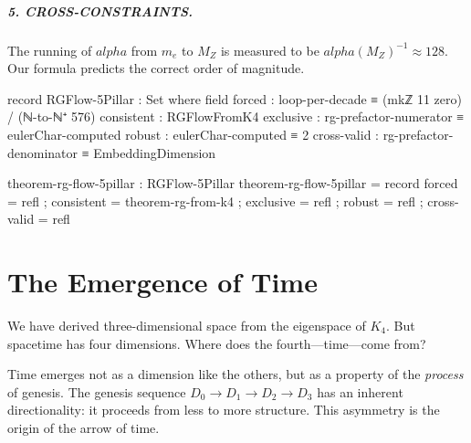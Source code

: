\documentclass[11pt,a4paper]{book}
\def\alpha{alpha}%
\begin{document}
\paragraph{5. CROSS-CONSTRAINTS.} The running of $\alpha$ from $m_e$ to $M_Z$ is measured to be $\alpha(M_Z)^{-1} \approx 128$. Our formula predicts the correct order of magnitude.

\begin{code}
record RGFlow-5Pillar : Set where
  field
    forced       : loop-per-decade ≡ (mkℤ 11 zero) / (ℕ-to-ℕ⁺ 576)
    consistent   : RGFlowFromK4
    exclusive    : rg-prefactor-numerator ≡ eulerChar-computed
    robust       : eulerChar-computed ≡ 2
    cross-valid  : rg-prefactor-denominator ≡ EmbeddingDimension

theorem-rg-flow-5pillar : RGFlow-5Pillar
theorem-rg-flow-5pillar = record
  { forced      = refl
  ; consistent  = theorem-rg-from-k4
  ; exclusive   = refl
  ; robust      = refl
  ; cross-valid = refl
  }
\end{code}

\chapter{The Emergence of Time}
\label{chap:emergence-time}

We have derived three-dimensional space from the eigenspace of $K_4$. But spacetime has 
four dimensions. Where does the fourth—time—come from?

Time emerges not as a dimension like the others, but as a property of the \emph{process} 
of genesis. The genesis sequence $D_0 \to D_1 \to D_2 \to D_3$ has an inherent directionality: 
it proceeds from less to more structure. This asymmetry is the origin of the arrow of time.
\end{document}
